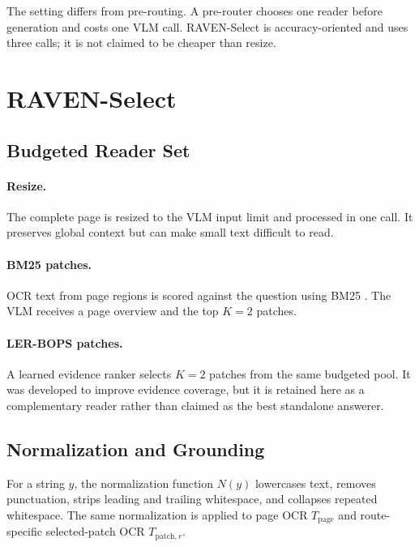 \documentclass[journal]{IEEEtran}
\begin{document}
The setting differs from pre-routing.  A pre-router chooses one reader before
generation and costs one VLM call.  RAVEN-Select is accuracy-oriented and uses
three calls; it is not claimed to be cheaper than resize.

\section{RAVEN-Select}
\subsection{Budgeted Reader Set}
\paragraph{Resize.}
The complete page is resized to the VLM input limit and processed in one call.
It preserves global context but can make small text difficult to read.

\paragraph{BM25 patches.}
OCR text from page regions is scored against the question using BM25
\cite{bm25}.  The VLM receives a page overview and the top $K=2$ patches.

\paragraph{LER-BOPS patches.}
A learned evidence ranker selects $K=2$ patches from the same budgeted pool.
It was developed to improve evidence coverage, but it is retained here as a
complementary reader rather than claimed as the best standalone answerer.

\subsection{Normalization and Grounding}
For a string $y$, the normalization function $N(y)$ lowercases text, removes
punctuation, strips leading and trailing whitespace, and collapses repeated
whitespace.  The same normalization is applied to page OCR $T_{\mathrm{page}}$
and route-specific selected-patch OCR $T_{\mathrm{patch},r}$.
\end{document}
